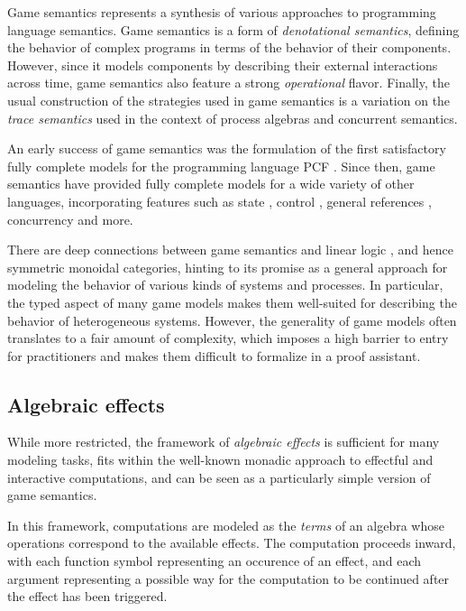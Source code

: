 \documentclass[11pt,oneside,draft]{book}
\theoremstyle{definition}
\begin{document}
Game semantics represents a synthesis
of various approaches to programming language semantics.
Game semantics is a form of \emph{denotational semantics},
defining the behavior of complex programs
in terms of the behavior of their components.
However,
since it models components
by describing their external interactions across time,
game semantics also feature a strong \emph{operational} flavor.
Finally,
the usual construction of the strategies used in game semantics
is a variation on the \emph{trace semantics}
used in the context of process algebras
and concurrent semantics.

An early success of game semantics
was the formulation of the first satisfactory
fully complete models for
the programming language PCF \citep{pcfajm,pcfho}.
Since then,
game semantics have provided fully complete models
for a wide variety of other languages,
incorporating features such as
state \citep{gsia},
control \citep{gscontrol},
general references \citep{gsgr},
concurrency \citep{gsconcur}
and more.

There are deep connections between
game semantics and linear logic \citep{gsnecessary},
and hence symmetric monoidal categories,
hinting to its promise
as a general approach for modeling the behavior of
various kinds of systems and processes.
In particular,
the typed aspect of many game models
makes them well-suited for
describing the behavior of heterogeneous systems.
However,
the generality of game models
often translates to a fair amount of complexity,
which imposes a high barrier to entry for practitioners
and makes them difficult to formalize in a proof assistant.


\subsection{Algebraic effects} %

While more restricted,
the framework of \emph{algebraic effects} \citep{effadq}
is sufficient for many modeling tasks,
fits within the well-known monadic approach
to effectful and interactive computations,
and can be seen as a particularly simple version
of game semantics.

In this framework,
computations are modeled as the \emph{terms}
of an algebra whose operations correspond to
the available effects. %
The computation proceeds inward,
with each function symbol representing an occurence of an effect,
and each argument representing a possible way
for the computation to be continued
after the effect has been triggered.
\end{document}
